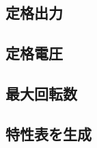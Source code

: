 \subsection{定格出力}\label{sub:teikakusyutu}


\subsection{定格電圧}\label{sub:teikakudennatu}


\subsection{最大回転数}\label{sub:saidaikaiten}




\subsection{特性表を生成}\label{sub:seisei_hyou}
